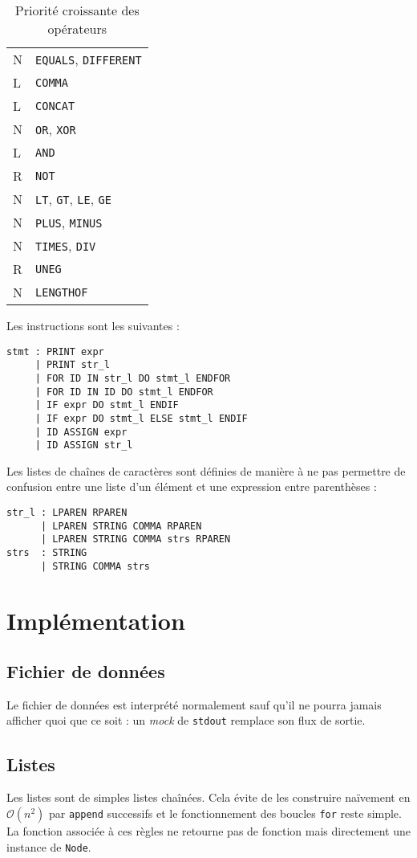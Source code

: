 \documentclass[12pt,twocolumn]{article}
\newcommand{\bigO}{\mathcal{O}}
\begin{document}
\begin{table}[b]
\center
\begin{tabular}{l|l}
	N & \texttt{EQUALS}, \texttt{DIFFERENT} \\
	L & \texttt{COMMA} \\
	L & \texttt{CONCAT} \\
	N & \texttt{OR}, \texttt{XOR} \\
	L & \texttt{AND} \\
	R & \texttt{NOT} \\
	N & \texttt{LT}, \texttt{GT}, \texttt{LE}, \texttt{GE} \\
	N & \texttt{PLUS}, \texttt{MINUS} \\
	N & \texttt{TIMES}, \texttt{DIV} \\
	R & \texttt{UNEG} \\
	N & \texttt{LENGTHOF}
\end{tabular}
\caption{Priorité croissante des opérateurs}
\label{tab:prio}
\end{table}

Les instructions sont les suivantes :
\begin{verbatim}
stmt : PRINT expr
     | PRINT str_l
     | FOR ID IN str_l DO stmt_l ENDFOR
     | FOR ID IN ID DO stmt_l ENDFOR
     | IF expr DO stmt_l ENDIF
     | IF expr DO stmt_l ELSE stmt_l ENDIF
     | ID ASSIGN expr
     | ID ASSIGN str_l
\end{verbatim}

Les listes de chaînes de caractères sont définies de manière à ne pas permettre
de confusion entre une liste d'un élément et une expression entre parenthèses :
\begin{verbatim}
str_l : LPAREN RPAREN
      | LPAREN STRING COMMA RPAREN
      | LPAREN STRING COMMA strs RPAREN
strs  : STRING
      | STRING COMMA strs
\end{verbatim}


\section{Implémentation}
\subsection{Fichier de données}
Le fichier de données est interprété normalement sauf qu'il ne pourra jamais
afficher quoi que ce soit : un \textit{mock} de \texttt{stdout} remplace son
flux de sortie.


\subsection{Listes}
Les listes sont de simples listes chaînées. Cela évite de les construire
naïvement en $\bigO(n^2)$ par \texttt{append} successifs et le fonctionnement
des boucles \texttt{for} reste simple. La fonction associée à ces règles
ne retourne pas de fonction mais directement une instance de \texttt{Node}.
\end{document}
